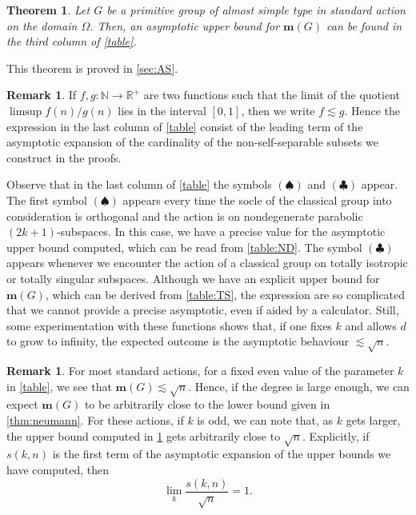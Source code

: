 \documentclass[a4paper]{amsart}
\newcommand{\m}{\mathbf{m}}
\newcommand{\NN}{\mathbb{N}}
\newtheorem{thmx}{Theorem}[]
\theoremstyle{definition}
\newtheorem{remark}[theorem]{Remark}
\begin{document}
\begin{thmx}\label{thm:AS}
    Let $G$ be a primitive group of almost simple type in standard action on the domain $\Omega$. Then, an asymptotic upper bound for $\m(G)$ can be found in the third column of \cref{table}.
\end{thmx}
This theorem is proved in \cref{sec:AS}.
\begin{remark}\label{remark:symbols}
    If $f,g: \NN \to \mathbb{R}^+$ are two functions such that the limit of the quotient $\limsup f(n)/g(n)$ lies in the interval $[0,1]$, then we write $f \lesssim g$. Hence the expression in the last column of \cref{table} consist of the leading term of the asymptotic expansion of the cardinality of the non-self-separable subsets we construct in the proofs.
    
    Observe that in the last column of \cref{table} the symbols $(\spadesuit)$ and $(\clubsuit)$ appear. The first symbol $(\spadesuit)$ appears every time the socle of the classical group into consideration is orthogonal and the action is on nondegenerate parabolic $(2k+1)$-subspaces. In this case, we have a precise value for the asymptotic upper bound computed, which can be read from \cref{table:ND}. The symbol $(\clubsuit)$ appears whenever we encounter the action of a classical group on totally isotropic or totally singular subspaces. Although we have an explicit upper bound for $\m(G)$, which can be derived from \cref{table:TS}, the expression are so complicated that we cannot provide a precise asymptotic, even if aided by a calculator. Still, some experimentation with these functions shows that, if one fixes $k$ and allows $d$ to grow to infinity, the expected outcome is the asymptotic behaviour $\lesssim \sqrt{n}$. %
\end{remark}

\begin{remark}\label{rem:AS}
    For most standard actions, for a fixed even value of the parameter $k$ in \cref{table}, we see that $\m(G) \lesssim \sqrt{n}$. Hence, if the degree is large enough, we can expect $\m(G)$ to be arbitrarily close to the lower bound given in \cref{thm:neumann}. For these actions, if $k$ is odd, we can note that, as $k$ gets larger, the upper bound computed in \cref{thm:AS} gets arbitrarily close to $\sqrt{n}$. Explicitly, if $s(k,n)$ is the first term of the asymptotic expansion of the upper bounds we have computed, then
    \[ \lim_k \frac{s(k,n)}{ \sqrt{n}} = 1 .\]
\end{remark}
\end{document}
